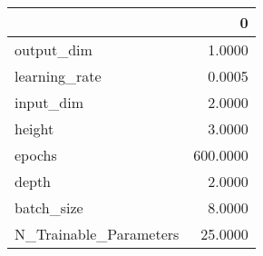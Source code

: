\begin{tabular}{lr}
\toprule
{} &         0 \\
\midrule
output\_dim             &    1.0000 \\
learning\_rate          &    0.0005 \\
input\_dim              &    2.0000 \\
height                 &    3.0000 \\
epochs                 &  600.0000 \\
depth                  &    2.0000 \\
batch\_size             &    8.0000 \\
N\_Trainable\_Parameters &   25.0000 \\
\bottomrule
\end{tabular}
